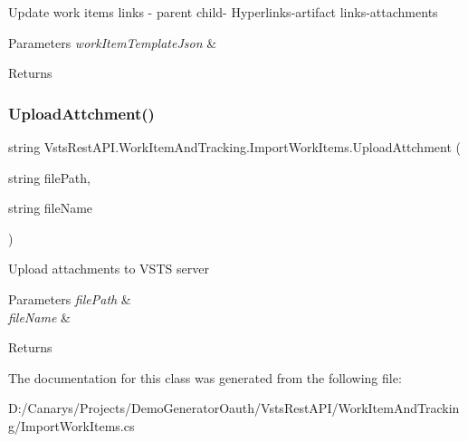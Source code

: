 Update work items links -\/ parent child-\/ Hyperlinks-\/artifact links-\/attachments 


\begin{DoxyParams}{Parameters}
{\em work\+Item\+Template\+Json} & \\
\hline
\end{DoxyParams}
\begin{DoxyReturn}{Returns}

\end{DoxyReturn}
\mbox{\label{class_vsts_rest_a_p_i_1_1_work_item_and_tracking_1_1_import_work_items_a5845172621eec8d4991f3633077dc498}} 
\subsubsection{\texorpdfstring{Upload\+Attchment()}{UploadAttchment()}}
{\footnotesize\ttfamily string Vsts\+Rest\+A\+P\+I.\+Work\+Item\+And\+Tracking.\+Import\+Work\+Items.\+Upload\+Attchment (\begin{DoxyParamCaption}\item[{string}]{file\+Path,  }\item[{string}]{file\+Name }\end{DoxyParamCaption})}



Upload attachments to V\+S\+TS server 


\begin{DoxyParams}{Parameters}
{\em file\+Path} & \\
\hline
{\em file\+Name} & \\
\hline
\end{DoxyParams}
\begin{DoxyReturn}{Returns}

\end{DoxyReturn}


The documentation for this class was generated from the following file\+:\begin{DoxyCompactItemize}
\item 
D\+:/\+Canarys/\+Projects/\+Demo\+Generator\+Oauth/\+Vsts\+Rest\+A\+P\+I/\+Work\+Item\+And\+Tracking/Import\+Work\+Items.\+cs\end{DoxyCompactItemize}
